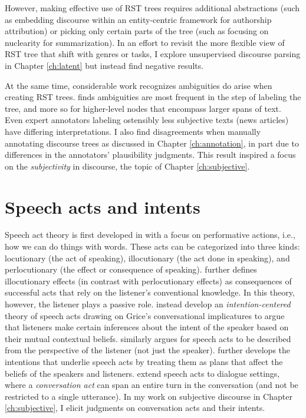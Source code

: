 However, making effective use of RST trees requires additional abstractions (such as embedding discourse within an entity-centric framework for authorship attribution) or picking only certain parts of the tree (such as focusing on nuclearity for summarization). In an effort to revisit the more flexible view of RST tree that shift with genres or tasks, I explore unsupervised discourse parsing in Chapter \ref{ch:latent} but instead find negative results.  

At the same time, considerable work recognizes ambiguities do arise when creating RST trees. 
 finds ambiguities are most frequent in the step of labeling the tree, and more so for higher-level nodes that encompass larger spans of text. Even expert annotators labeling ostensibly less subjective texts (news articles)  have differing interpretations. I also find disagreements when manually annotating discourse trees as discussed in Chapter \ref{ch:annotation}, in part due to differences in the annotators' plausibility judgments. This result inspired a focus on the \emph{subjectivity} in discourse, the topic of Chapter \ref{ch:subjective}.

\section{Speech acts and intents}

Speech act theory is first developed in  with a focus on performative actions, i.e., how we can do things with words. These acts can be categorized into three kinds: locutionary (the act of speaking), illocutionary (the act done in speaking), and perlocutionary (the effect or consequence of speaking).  further defines illocutionary effects (in contrast with perlocutionary effects) as consequences of successful acts that rely on the listener's conventional knowledge. In this theory, however, the listener plays a passive role.  instead develop an \emph{intention-centered} theory of speech acts drawing on Grice's conversational implicatures \cite{Grice:1967} to argue that listeners make certain inferences about the intent of the speaker based on their mutual contextual beliefs.   similarly argues for speech acts to be described from the perspective of the listener (not just the speaker).  further develops the intentions that underlie speech acts by treating them as plans that affect the beliefs of the speakers and listeners.  extend speech acts to dialogue settings, where a \emph{conversation act} can span an entire turn in the conversation (and not be restricted to a single utterance). In my work on subjective discourse in Chapter \ref{ch:subjective}, I elicit judgments on conversation acts and their intents.

